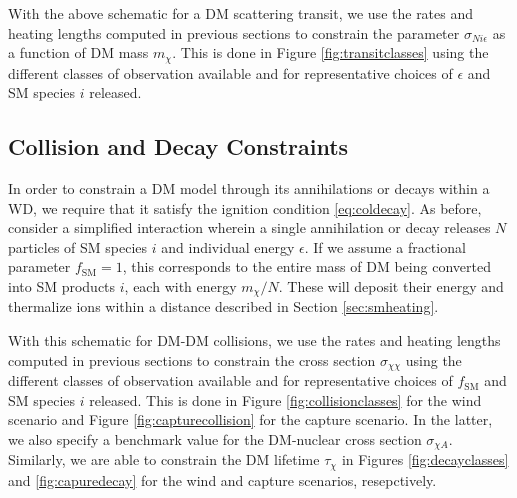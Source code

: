 With the above schematic for a DM scattering transit, we use the rates and heating lengths computed in previous sections to constrain the parameter $\sigma_{Ni\epsilon}$ as a function of DM mass $m_\chi$.
This is done in Figure \ref{fig:transitclasses} using the different classes of observation available and for representative choices of $\epsilon$ and SM species $i$ released.

\subsection{Collision and Decay Constraints}
\label{sec:CollisionConstraints}

In order to constrain a DM model through its annihilations or decays within a WD, we require that it satisfy the ignition condition \eqref{eq:coldecay}.
As before, consider a simplified interaction wherein a single annihilation or decay releases $N$ particles of SM species $i$ and individual energy $\epsilon$.
If we assume a fractional parameter $f_\text{SM}=1$, this corresponds to the entire mass of DM being converted into SM products $i$, each with energy $m_\chi/N$.
These will deposit their energy and thermalize ions within a distance described in Section \ref{sec:smheating}.

With this schematic for DM-DM collisions, we use the rates and heating lengths computed in previous sections to constrain the cross section $\sigma_{\chi \chi}$ using the different classes of observation available and for representative choices of $f_\text{SM}$ and SM species $i$ released.
This is done in Figure \ref{fig:collisionclasses} for the wind scenario and Figure \ref{fig:capturecollision} for the capture scenario. 
In the latter, we also specify a benchmark value for the DM-nuclear cross section $\sigma_{\chi A}$. 
Similarly, we are able to constrain the DM lifetime $\tau_\chi$ in Figures \ref{fig:decayclasses} and \ref{fig:capuredecay} for the wind and capture scenarios, resepctively. 


